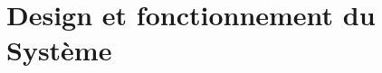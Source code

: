 \documentclass[master.tex]{subfiles}
\begin{document}
\chapter{Design et fonctionnement du Système}


\end{document}
